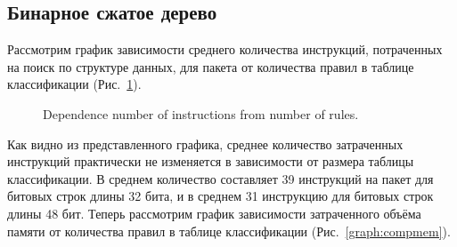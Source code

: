 \documentclass[9pt,a4paper]{article}
\begin{document}
        \subsection{Бинарное сжатое дерево}
            Рассмотрим график зависимости среднего количества инструкций, потраченных на поиск по структуре данных, для пакета от количества правил в таблице классификации (Рис.~\ref{graph:compinst}).
            \begin{figure}[h!]
                \centering
                \captionsetup{justification=centering}
                \caption{Dependence number of instructions from number of rules.}
                \label{graph:compinst}
            \end{figure}
            Как видно из представленного графика, среднее количество затраченных инструкций практически не изменяется в зависимости от размера таблицы классификации. 
            В среднем количество составляет 39 инструкций на пакет для битовых строк длины 32 бита, и в среднем 31 инструкцию для битовых строк длины 48 бит.
            Теперь рассмотрим график зависимости затраченного объёма памяти от количества правил в таблице классификации (Рис.~\ref{graph:compmem}).
\end{document}

